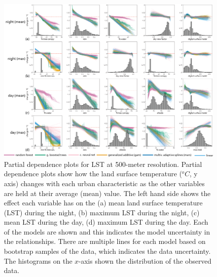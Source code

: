 \documentclass[final,3p,times,twocolumn,sort&compress]{elsarticle}
\begin{document}
\begin{figure}[h]
    \centering
    \includegraphics[width=\linewidth]{fig/report/pdp_500.png}
    \caption[Partial dependence plots for LST at 500-meter resolution]{
    Partial dependence plots for LST at 500-meter resolution.
    Partial dependence plots show how the land surface temperature ($^oC$, y axis) changes with each urban characteristic as the other variables are held at their average (mean) value. 
    The left hand side shows the effect each variable has on the (a) mean land surface temperature (LST) during the night, (b) maximum LST during the night, (c) mean LST during the day, (d) maximum LST during the day. 
    Each of the models are shown and this indicates the model uncertainty in the relationships.
    There are multiple lines for each model based on bootstrap samples of the data, which indicates the data uncertainty.
    The histograms on the $x$-axis shown the distribution of the observed data.
    }
    \label{fig:pdp_500}
\end{figure}
\end{document}
